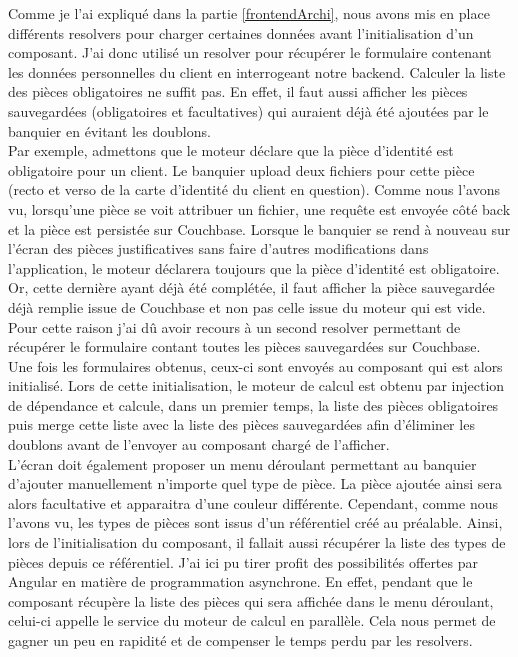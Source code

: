 	Comme je l'ai expliqué dans la partie \ref{frontendArchi}, nous avons mis en place différents resolvers pour charger certaines données avant l'initialisation d'un composant. J'ai donc utilisé un resolver pour récupérer le formulaire contenant les données personnelles du client en interrogeant notre backend. Calculer la liste des pièces obligatoires ne suffit pas. En effet, il faut aussi afficher les pièces sauvegardées (obligatoires et facultatives) qui auraient déjà été ajoutées par le banquier en évitant les doublons. \\
	
	Par exemple, admettons que le moteur déclare que la pièce d'identité est obligatoire pour un client. Le banquier upload deux fichiers pour cette pièce (recto et verso de la carte d'identité du client en question). Comme nous l'avons vu, lorsqu'une pièce se voit attribuer un fichier, une requête est envoyée côté back et la pièce est persistée sur Couchbase. Lorsque le banquier se rend à nouveau sur l'écran des pièces justificatives sans faire d'autres modifications dans l'application, le moteur déclarera toujours que la pièce d'identité est obligatoire. Or, cette dernière ayant déjà été complétée, il faut afficher la pièce sauvegardée déjà remplie issue de Couchbase et non pas celle issue du moteur qui est vide. Pour cette raison j'ai dû avoir recours à un second resolver permettant de récupérer le formulaire contant toutes les pièces sauvegardées sur Couchbase. \\
	
	Une fois les formulaires obtenus, ceux-ci sont envoyés au composant qui est alors initialisé. Lors de cette initialisation, le moteur de calcul est obtenu par injection de dépendance et calcule, dans un premier temps, la liste des pièces obligatoires puis merge cette liste avec la liste des pièces sauvegardées afin d'éliminer les doublons avant de l'envoyer au composant chargé de l'afficher. \\
	
	L'écran doit également proposer un menu déroulant permettant au banquier d'ajouter manuellement n'importe quel type de pièce. La pièce ajoutée ainsi sera alors facultative et apparaitra d'une couleur différente. Cependant, comme nous l'avons vu, les types de pièces sont issus d'un référentiel créé au préalable. Ainsi, lors de l'initialisation du composant, il fallait aussi récupérer la liste des types de pièces depuis ce référentiel. J'ai ici pu tirer profit des possibilités offertes par Angular en matière de programmation asynchrone. En effet, pendant que le composant récupère la liste des pièces qui sera affichée dans le menu déroulant, celui-ci appelle le service du moteur de calcul en parallèle. Cela nous permet de gagner un peu en rapidité et de compenser le temps perdu par les resolvers.

